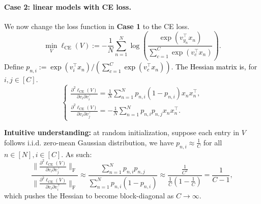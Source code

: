 \documentclass{article}
\newcommand{\1}{^{(1)}}
\newcommand{\2}{^{(2)}}
\renewcommand{\l}{\left}
\renewcommand{\r}{\right}
\newcommand{\zhaoruirevise}[1]{\textcolor{black}{ #1}}
\begin{document}
\paragraph{Case 2: linear models with CE loss.}
We now change the loss function in {\bf Case 1} to \zhaoruirevise{the} CE loss.
\begin{equation}
    \label{eq_linear_model_ce}
    \min_V  \ell_{\text{CE}}(V) := -  \frac{1}{N}\sum_{n= 1}^N \log\left(\frac{\exp({v_{y_n}^\top x_n})}{\sum_{c=1}^C\exp({v_c^\top x_n})}\right).
\end{equation}
Define \zhaoruirevise{$p_{n,i} := \exp({v_i^\top x_n})/\l({\sum_{c=1}^C\exp({v_c^\top x_n})}\r)$}. \zhaoruirevise{The Hessian matrix is, }for $i,j \in [C]$.
\begin{equation}
\label{eq_linear_model_ce_Hessian}
\left\{\begin{array}{l}
    \frac{\partial^2\ell_{\text{CE}}(V)}{\partial v_i  \partial v_i^\top} = \frac{1}{N}\sum_{n= 1}^N  p_{n,i} (1-p_{n,i}) x_n x_n^\top,   \\[2mm]
    \frac{\partial^2\ell_{\text{CE}}(V)}{\partial v_i  \partial v_j^\top} =-  \frac{1}{N}\sum_{n= 1}^N p_{n,i} p_{n,j} x_n x_n^\top .
\end{array}\right.
\end{equation}
\begin{snugshade}
{\bf Intuitive understanding:} at random initialization, suppose each entry in $V$ follows i.i.d. zero-mean Gaussian distribution, we have $p_{n,i} \approx \frac{1}{C}$ for all $n \in [N], i \in [C]$. As such: 
\begin{equation}
\frac{\bigg\|  \frac{\partial^2\ell_{\text{CE}}(V)}{\partial v_i  \partial v_j^\top} \bigg\|_{\operatorname{F}}}{\bigg\|    \frac{\partial^2\ell_{\text{CE}}(V)}{\partial v_i  \partial v_i^\top} 
 \bigg\|_{\operatorname{F}}}
  \approx  \frac{ \sum_{n=1}^N p_{n,i} p_{n,j}} {\sum_{n=1}^N  p_{n,i} (1-p_{n,i})}\approx \frac{  \frac{1}{C^2}}{ \frac{1}{C}\left(1-\frac{1}{C}\right)} = \frac{1}{C-1},
\end{equation} 
which pushes the Hessian to become block-diagonal as $C \rightarrow \infty$. 
\vspace{-0.2cm}
\end{snugshade}
\end{document}

